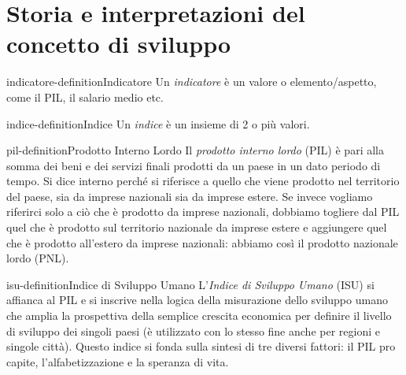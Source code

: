 \documentclass[preview]{standalone}
\begin{document}
\genpage

\section{Storia e interpretazioni del concetto di sviluppo}

\begin{snippetdefinition}{indicatore-definition}{Indicatore}
    Un \textit{indicatore} è un valore o elemento/aspetto, come il PIL, il salario medio etc.
\end{snippetdefinition}

\begin{snippetdefinition}{indice-definition}{Indice}
    Un \textit{indice} è un insieme di 2 o più valori.
\end{snippetdefinition}


\begin{snippetdefinition}{pil-definition}{Prodotto Interno Lordo}
    Il \textit{prodotto interno lordo} (PIL) è pari alla somma dei beni e dei servizi finali
    prodotti da un paese in un dato periodo di tempo. Si dice interno perché si riferisce
    a quello che viene prodotto nel territorio del paese, sia da imprese nazionali sia
    da imprese estere. Se invece vogliamo riferirci solo a ciò che è prodotto da
    imprese nazionali, dobbiamo togliere dal PIL quel che è prodotto sul territorio
    nazionale da imprese estere e aggiungere quel che è prodotto all'estero da
    imprese nazionali: abbiamo così il prodotto nazionale lordo (PNL).
\end{snippetdefinition}


\begin{snippetdefinition}{isu-definition}{Indice di Sviluppo Umano}
    L'\textit{Indice di Sviluppo Umano} (ISU) si affianca al PIL e si inscrive
    nella logica della misurazione dello sviluppo umano che amplia la prospettiva
    della semplice crescita economica per definire il livello di sviluppo dei singoli
    paesi (è utilizzato con lo stesso fine anche per regioni e singole città).
    Questo indice si fonda sulla sintesi di tre diversi fattori: il PIL pro capite,
    l'alfabetizzazione e la speranza di vita.
\end{snippetdefinition}
\end{document}
